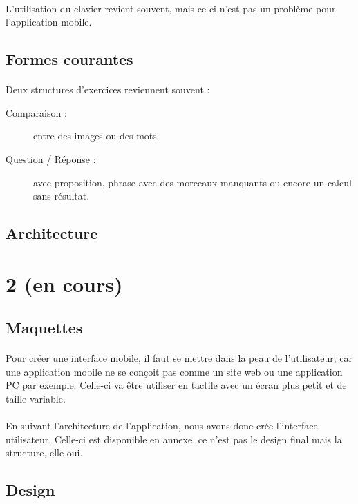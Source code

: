\documentclass[french]{report}
\begin{document}
\paragraph{}L'utilisation du clavier revient souvent, mais ce-ci n'est pas un problème pour l'application mobile.

\subsection{Formes courantes}
\paragraph{}Deux structures d'exercices reviennent souvent :
\begin{description}
\item[Comparaison : ] entre des images ou des mots.
\item[Question / Réponse : ] avec proposition, phrase avec des morceaux manquants ou encore un calcul sans résultat.
\end{description}
\subsection{Architecture}
\section{2\ieme{} \sprint{} (en cours)}
\label{sprint2}
\subsection{Maquettes}
\paragraph{}Pour créer une interface mobile, il faut se mettre dans la peau de l'utilisateur, car une application mobile ne se conçoit pas comme un site web ou une application PC par exemple. Celle-ci va être utiliser en tactile avec un écran plus petit et de taille variable.

\paragraph{}En suivant l'architecture de l'application, nous avons donc crée l'interface utilisateur. Celle-ci est disponible en annexe, ce n'est pas le design final mais la structure, elle oui.
\subsection{Design}
\end{document}
